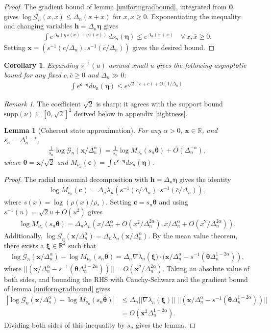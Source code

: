 \documentclass[a4paper,11pt]{article}
\theoremstyle{plain}
\newtheorem{lem}[thm]{Lemma}
\newtheorem{cor}{Corollary}
\theoremstyle{definition}
\theoremstyle{remark}
\newtheorem*{rem}{Remark}
\newcommand{\bs}[1]{\boldsymbol{#1}}
\newcommand{\ba}{\begin{equation} \begin{aligned}}
\newcommand{\ea}{\end{aligned} \end{equation}}
\newcommand{\De}{\Delta}
\begin{document}
\begin{appendix}
\begin{proof}
The gradient bound of lemma \ref{uniformgradbound}, integrated from $\bs{0}$, gives $\log\mathcal{G}_n(x,\bar{x}) \leq \De_n(x + \bar{x})$ for $x, \bar{x} \geq 0$. Exponentiating the inequality and changing variables $\bs{h} = \De_n\bs{\eta}$ gives
\ba
\int e^{\De_n(\eta\, s(x) + \bar{\eta}\, s(\bar{x}))}\, d\nu_n(\bs{\eta}) \leq e^{\De_n(x+\bar{x})} \quad \forall\, x, \bar{x} \geq 0.
\ea
Setting  $\bs{x} = ( s^{-1}(c/\De_n),s^{-1}(\bar{c}/\De_n)) $  gives the desired bound. 
\end{proof}
 \begin{cor}
     Expanding $s^{-1}(u)$ around small $u$ gives the following asymptotic bound for any fixed $c,\bar{c} \geq 0$ and $\De_n \gg 0$:
     \ba
        \int e^{\bs{c} \cdot \bs{\eta}} d\nu_n(\bs{\eta}) \leq e^{\sqrt{2}(c+\bar{c}) + O(1/\De_n) }.
     \ea
 \end{cor}
\begin{rem}
The coefficient $\sqrt{2}$ is sharp: it agrees with the support bound $\mathrm{supp}(\nu) \subseteq [0,\sqrt{2}]^2$ derived below in appendix \ref{tightness}.
\end{rem}

\begin{lem}[Coherent state approximation]\label{cohstateapprox}
    For any $\alpha>0$, $\bs{x} \in \mathbb{R}$, and $s_n = \De_n^{1-\alpha}$,
    \ba
\frac{1}{s_n} \log \mathcal{G}_n(\bs{x}/\De_n^\alpha) = \frac{1}{s_n}\log M_{\nu_n}(s_n \bs{\theta}) + O(\De_n^{-\alpha}),
    \ea
    where $\bs{\theta} = \bs{x}/\sqrt{2}$ and $M_{\nu_n}(\bs{c}) = \int e^{\bs{c} \cdot \bs{\eta}} d\nu_n(\bs{\eta})$.
\end{lem}
\begin{proof}
    The radial monomial decomposition with $\bs{h} = \De_n \bs{\eta}$ gives the identity
    \ba
 \log M_{\nu_n}(\bs{c}) = \De_n \lambda_n\left(s^{-1}(c/\De_n),s^{-1}(\bar{c}/\De_n) \right),
    \ea
    where $s(x) = \log(\rho(x)/\rho_*)$. Setting $\bs{c} = s_n \bs{\theta}$ and using $s^{-1}(u) = \sqrt{2} u + O(u^2)$ gives
    \ba
\log M_{\nu_n}(s_n \bs{\theta}) = \De_n \lambda_n\left( x/\De_n^\alpha + O(x^2/\De_n^{2\alpha}), \bar{x}/\De_n^\alpha + O(\bar{x}^2/\De_n^{2\alpha}) \right).
    \ea
    Additionally,  $\log \mathcal{G}_n(\bs{x}/\De_n^\alpha) = \De_n \lambda_n(\bs{x}/\De_n^\alpha)$. By the mean value theorem, there exists a $\bs{\xi} \in \mathbb{R}^2$ such that
    \ba
\log \mathcal{G}_n(\bs{x}/\De_n^\alpha) - \log M_{\nu_n}(s_n \bs{\theta})  = \De_n \nabla \lambda_n\left(\bs{\xi}) \cdot ( \bs{x}/\De_n^\alpha - s^{-1}(\bs{\theta} \De_n^{1-2\alpha}) \right) ,
    \ea
where $||( \bs{x}/\De_n^\alpha - s^{-1}(\bs{\theta} \De_n^{1-2\alpha}) )|| = O(\bs{x}^2/\De_n^{2\alpha})$. Taking an absolute value of both sides, and bounding the RHS with Cauchy-Schwarz and the gradient bound of lemma \ref{uniformgradbound} gives
\ba
|\log \mathcal{G}_n(\bs{x}/\De_n^\alpha) - \log M_{\nu_n}(s_n \bs{\theta})| &\leq \De_n || \nabla \lambda_n(\bs{\xi}) ||  \; || ( \bs{x}/\De_n^\alpha - s^{-1}(\bs{\theta} \De_n^{1-2\alpha}) )||
\\&=O(\bs{x}^2 \De_n^{1-2\alpha}).
\ea
Dividing both sides of this inequality by $s_n$ gives the lemma.
\end{proof}


\end{appendix}
\end{document}
